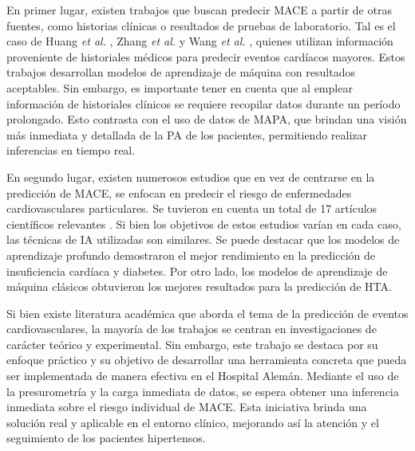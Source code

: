 En primer lugar, existen trabajos que buscan predecir MACE a partir de otras fuentes, como historias clínicas 
o resultados de pruebas de laboratorio. Tal es el caso de Huang \emph{et al.} \citep{CITE:11}, Zhang \emph{et al.} \citep{CITE:12} y 
Wang \emph{et al.} \citep{CITE:13}, quienes utilizan información proveniente de historiales médicos para predecir eventos 
cardíacos mayores. Estos trabajos desarrollan modelos de aprendizaje de máquina con resultados aceptables. 
Sin embargo, es importante tener en cuenta que 
al emplear información de historiales clínicos se requiere recopilar datos durante un período prolongado. 
Esto contrasta con el uso de datos de MAPA, que brindan una visión más inmediata y detallada de la PA de los pacientes, 
permitiendo realizar inferencias en tiempo real.

En segundo lugar, existen numerosos estudios que en vez de centrarse en la predicción de MACE, se enfocan en 
predecir el riesgo de enfermedades cardiovasculares particulares. Se tuvieron en cuenta un total de 17 artículos científicos 
relevantes \citep{CITE:14} \citep{CITE:15} \citep{CITE:16} \citep{CITE:17} \citep{CITE:18}
\citep{CITE:19} \citep{CITE:20} \citep{CITE:21} \citep{CITE:22} \citep{CITE:23} \citep{CITE:24}
\citep{CITE:25} \citep{CITE:26} \citep{CITE:27} \citep{CITE:28} \citep{CITE:29} \citep{CITE:30} \citep{CITE:31}.  
Si bien los objetivos de estos estudios varían en cada caso, las técnicas de IA utilizadas son similares. 
Se puede destacar que los modelos de aprendizaje profundo demostraron el mejor rendimiento en la predicción de 
insuficiencia cardíaca y diabetes. Por otro lado, los modelos de aprendizaje de máquina clásicos obtuvieron 
los mejores resultados para la predicción de HTA.

Si bien existe literatura académica que aborda el tema de la predicción de eventos cardiovasculares, 
la mayoría de los trabajos se centran en investigaciones de carácter teórico y experimental. Sin embargo, este trabajo 
se destaca por su enfoque práctico y su objetivo de desarrollar una herramienta concreta que pueda ser implementada 
de manera efectiva en el Hospital Alemán. Mediante el uso de la presurometría  y la carga inmediata de datos, se espera 
obtener una inferencia inmediata sobre el riesgo individual de MACE. Esta iniciativa brinda una solución real y 
aplicable en el entorno clínico, mejorando así la atención y el seguimiento de los pacientes hipertensos.